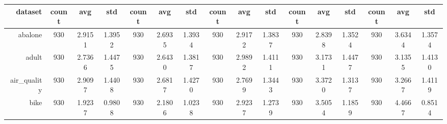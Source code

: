 \begin{table}[htbp]
{\begin{tabular}{rccccccccccccccc}
                  \cmidrule{2-16}    \textbf{dataset} & \textbf{count}                        & \textbf{avg}                                                                       & \textbf{std}    & \textbf{count} & \textbf{avg}                                                              & \textbf{std}    & \textbf{count} & \textbf{avg}                                                              & \textbf{std}    & \textbf{count} & \textbf{avg}                                                              & \textbf{std}    & \textbf{count} & \textbf{avg}    & \textbf{std}    \\
                  \midrule
                  abalone                             & 930                                   & 2.9151                                                                             & 1.3952          & 930            & \cellcolor[rgb]{ .776,  .937,  .808}\textcolor[rgb]{ 0,  .38,  0}{2.6935} & 1.3934          & 930            & 2.9172                                                                    & 1.3837          & 930            & 2.8398                                                                    & 1.3524          & 930            & 3.6344          & 1.3574          \\
                  adult                               & 930                                   & 2.7366                                                                             & 1.4475          & 930            & 2.6430                                                                    & 1.3817          & 930            & 2.9892                                                                    & 1.4111          & 930            & 3.1731                                                                    & 1.4477          & 930            & 3.1355          & 1.4130          \\
                  air\_quality                        & 930                                   & 2.9097                                                                             & 1.4408          & 930            & \cellcolor[rgb]{ .776,  .937,  .808}\textcolor[rgb]{ 0,  .38,  0}{2.6817} & 1.4270          & 930            & 2.7699                                                                    & 1.3443          & 930            & 3.3720                                                                    & 1.3137          & 930            & 3.2667          & 1.4119          \\
                  bike                                & 930                                   & 1.9237                                                                             & 0.9808          & 930            & 2.1806                                                                    & 1.0238          & 930            & 2.9237                                                                    & 1.2739          & 930            & 3.5054                                                                    & 1.1859          & 930            & 4.4667          & 0.8514          \\

\end{tabular}}
\end{table}
